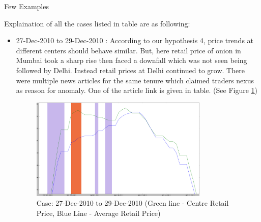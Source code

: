 \begin{table}[H]
\caption{Few Examples}
\label{examples}

\end{table}

Explaination of all the cases listed in table are as following:

\begin{itemize}
 \item 27-Dec-2010 to 29-Dec-2010 : According to our hypothesis 4, price trends at different centers should behave similar. But, here retail price of onion in Mumbai took a sharp rise then faced a downfall which was not seen being followed by Delhi. Instead retail prices at Delhi continued to grow. There were multiple news articles for the same tenure which claimed traders nexus as reason for anomaly. One of the article link is given in table. (See Figure \ref{fig:Mumbai_RetailvsAvg_ill1})
 
	\begin{figure}[H]
	\centering
	\includegraphics[width=0.8\textwidth]{graphs/Mumbai_RetailvsAvg_ill1.png}
	\caption{Case: 27-Dec-2010 to 29-Dec-2010 (Green line - Centre Retail Price, Blue Line - Average Retail Price)}
	\label{fig:Mumbai_RetailvsAvg_ill1}
	\end{figure}
  

\end{itemize}
